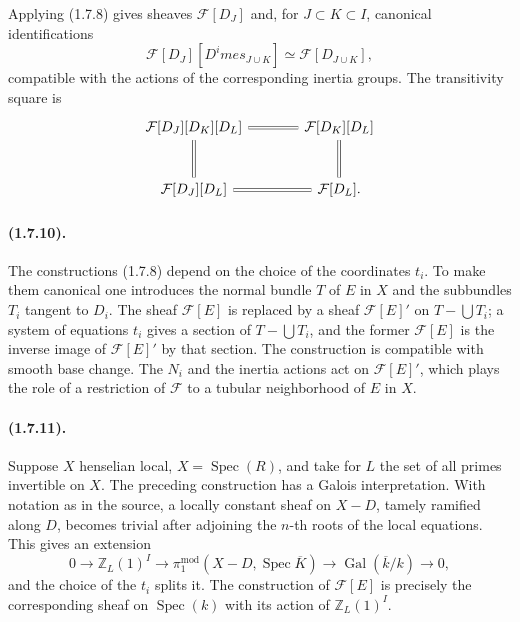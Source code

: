 \documentclass[11pt]{article}
\theoremstyle{remark}
\newcommand{\Spec}{\operatorname{Spec}}
\newcommand{\Gal}{\operatorname{Gal}}
\begin{document}
Applying (1.7.8) gives sheaves $\mathcal F[D_J]$ and, for $J\subset K\subset I$, canonical identifications
\begin{equation}\tag{1.7.9.1}
        \mathcal F[D_J][D^	imes_{J\cup K}]\simeq \mathcal F[D_{J\cup K}],
\end{equation}
compatible with the actions of the corresponding inertia groups. The transitivity square is
\[
\begin{tikzcd}[column sep=large,row sep=large]
\mathcal F[D_J][D_K][D_L] \arrow[r,equal] \arrow[d,equal] & \mathcal F[D_K][D_L] \arrow[d,equal]\\
\mathcal F[D_J][D_L] \arrow[r,equal] & \mathcal F[D_L].
\end{tikzcd}
\]

\paragraph{(1.7.10).} The constructions (1.7.8) depend on the choice of the coordinates $t_i$. To make them canonical one introduces the normal bundle $T$ of $E$ in $X$ and the subbundles $T_i$ tangent to $D_i$. The sheaf $\mathcal F[E]$ is replaced by a sheaf $\mathcal F[E]'$ on $T-\bigcup T_i$; a system of equations $t_i$ gives a section of $T-\bigcup T_i$, and the former $\mathcal F[E]$ is the inverse image of $\mathcal F[E]'$ by that section. The construction is compatible with smooth base change. The $N_i$ and the inertia actions act on $\mathcal F[E]'$, which plays the role of a restriction of $\mathcal F$ to a tubular neighborhood of $E$ in $X$.

\paragraph{(1.7.11).} Suppose $X$ henselian local, $X=\Spec(R)$, and take for $L$ the set of all primes invertible on $X$. The preceding construction has a Galois interpretation. With notation as in the source, a locally constant sheaf on $X-D$, tamely ramified along $D$, becomes trivial after adjoining the $n$-th roots of the local equations. This gives an extension
\[
0\longrightarrow \mathbb Z_L(1)^I\longrightarrow
\pi_1^{\mathrm{mod}}(X-D,\Spec\overline K)\longrightarrow \Gal(\overline k/k)\longrightarrow0,
\]
and the choice of the $t_i$ splits it. The construction of $\mathcal F[E]$ is precisely the corresponding sheaf on $\Spec(k)$ with its action of $\mathbb Z_L(1)^I$.
\end{document}

